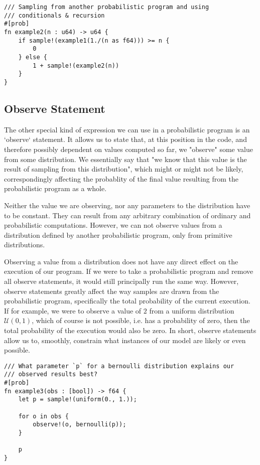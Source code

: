 \begin{minipage}{\linewidth}
\begin{lstlisting}
/// Sampling from another probabilistic program and using
/// conditionals & recursion
#[prob]
fn example2(n : u64) -> u64 {
    if sample!(example1(1./(n as f64))) >= n {
        0
    } else {
        1 + sample!(example2(n))
    }
}
\end{lstlisting}
\end{minipage}


\subsection{Observe Statement}

The other special kind of expression we can use in a probabilistic program is an `observe` statement. It allows us to state that, at this position in the code, and therefore possibly dependent on values computed so far, we "observe" some value from some distribution. We essentially say that "we know that this value is the result of sampling from this distribution", which might or might not be likely, correspondingly affecting the probablity of the final value resulting from the probabilistic program as a whole. 

Neither the value we are observing, nor any parameters to the distribution have to be constant. They can result from any arbitrary combination of ordinary and probabilistic computations. However, we can not observe values from a distribution defined by another probabilistic program, only from primitive distributions.

Observing a value from a distribution does not have any direct effect on the execution of our program. If we were to take a probabilistic program and remove all observe statements, it would still principally run the same way. However, observe statements greatly affect the way samples are drawn from the probabilistic program, specifically the total probability of the current execution. If for example, we were to observe a value of $2$ from a uniform distribution $\mathcal{U}(0,1)$, which of course is not possible, i.e. has a probability of zero, then the total probability of the execution would also be zero. In short, observe statements allow us to, smoothly, constrain what instances of our model are likely or even possible.

\begin{minipage}{\linewidth}
\begin{lstlisting}
/// What parameter `p` for a bernoulli distribution explains our
/// observed results best?
#[prob]
fn example3(obs : [bool]) -> f64 {
    let p = sample!(uniform(0., 1.));

    for o in obs {
        observe!(o, bernoulli(p));
    }

    p
}
\end{lstlisting}
\end{minipage}


